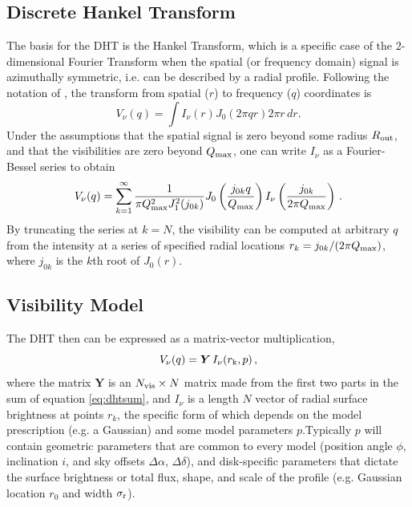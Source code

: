 \documentclass[fleqn,usenatbib]{mnras}
\begin{document}
\subsection{Discrete Hankel Transform}

The basis for the DHT is the Hankel Transform, which is a specific case of the 2-dimensional Fourier Transform when the spatial (or frequency domain) signal is azimuthally symmetric, i.e. can be described by a radial profile. Following the notation of \citet{2020MNRAS.tmp.1491J}, the transform from spatial ($r$) to frequency ($q$) coordinates is
\begin{equation}\label{eq:hankel}
    V_\nu(q) = \int I_\nu(r) J_0(2\pi q r) 2 \pi r \, dr.
\end{equation}
Under the assumptions that the spatial signal is zero beyond some radius $R_{\rm out}$, and that the visibilities are zero beyond $Q_{\rm max}$, one can write $I_\nu$ as a Fourier-Bessel series to obtain
\begin{equation}\label{eq:dhtsum}
    V_\nu(q) = \sum_{k=1}^\infty \frac{1}{\pi Q_{\rm max}^2 J_1^2(j_{0k})} J_0 \left( \frac{j_{0k} q}{Q_{\rm max}} \right) I_\nu \left( \frac{j_{0k}}{2 \pi Q_{\rm max}} \right) \, .
\end{equation}
By truncating the series at $k=N$, the visibility can be computed at arbitrary $q$ from the intensity at a series of specified radial locations $r_k=j_{0k}/(2\pi Q_{\rm max})$, where $j_{0k}$ is the $k$th root of $J_0(r)$.

\subsection{Visibility Model}

The DHT then can be expressed as a matrix-vector multiplication,
\begin{equation}\label{eq:dht}
    V_\nu(q) = \boldsymbol{Y} \, I_\nu(r_{\rm k}, p) \, ,
\end{equation}
where the matrix $\boldsymbol{Y}$ is an $N_{\rm vis} \times N$ matrix made from the first two parts in the sum of equation \ref{eq:dhtsum}, and $I_\nu$ is a length $N$ vector of radial surface brightness at points $r_k$, the specific form of which depends on the model prescription (e.g. a Gaussian) and some model parameters $p$.Typically $p$ will contain geometric parameters that are common to every model (position angle $\phi$, inclination $i$, and sky offsets $\Delta \alpha$, $\Delta \delta$), and disk-specific parameters that dictate the surface brightness or total flux, shape, and scale of the profile (e.g. Gaussian location $r_0$ and width $\sigma_{\rm r}$). %
\end{document}

